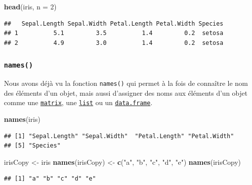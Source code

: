 \documentclass[]{book}
\newenvironment{Shaded}{\begin{snugshade}}{\end{snugshade}}
\newcommand{\DataTypeTok}[1]{\textcolor[rgb]{0.13,0.29,0.53}{#1}}
\newcommand{\DecValTok}[1]{\textcolor[rgb]{0.00,0.00,0.81}{#1}}
\newcommand{\KeywordTok}[1]{\textcolor[rgb]{0.13,0.29,0.53}{\textbf{#1}}}
\newcommand{\NormalTok}[1]{#1}
\newcommand{\StringTok}[1]{\textcolor[rgb]{0.31,0.60,0.02}{#1}}
\begin{document}
\begin{Shaded}
\begin{Highlighting}[]
\KeywordTok{head}\NormalTok{(iris, }\DataTypeTok{n =} \DecValTok{2}\NormalTok{)}
\end{Highlighting}
\end{Shaded}

\begin{verbatim}
##   Sepal.Length Sepal.Width Petal.Length Petal.Width Species
## 1          5.1         3.5          1.4         0.2  setosa
## 2          4.9         3.0          1.4         0.2  setosa
\end{verbatim}

\hypertarget{l015names}{%
\subsubsection{\texorpdfstring{\texttt{names()}}{names()}}\label{l015names}}

Nous avons déjà vu la fonction \texttt{names()} qui permet à la fois de connaître le nom des éléments d'un objet, mais aussi d'assigner des noms aux éléments d'un objet comme une \protect\hyperlink{l014matrix}{\texttt{matrix}}, une \protect\hyperlink{l014list}{\texttt{list}} ou un \protect\hyperlink{l014dataframe}{\texttt{data.frame}}.

\begin{Shaded}
\begin{Highlighting}[]
\KeywordTok{names}\NormalTok{(iris)}
\end{Highlighting}
\end{Shaded}

\begin{verbatim}
## [1] "Sepal.Length" "Sepal.Width"  "Petal.Length" "Petal.Width" 
## [5] "Species"
\end{verbatim}

\begin{Shaded}
\begin{Highlighting}[]
\NormalTok{irisCopy <-}\StringTok{ }\NormalTok{iris}
\KeywordTok{names}\NormalTok{(irisCopy) <-}\StringTok{ }\KeywordTok{c}\NormalTok{(}\StringTok{"a"}\NormalTok{, }\StringTok{"b"}\NormalTok{, }\StringTok{"c"}\NormalTok{, }\StringTok{"d"}\NormalTok{, }\StringTok{"e"}\NormalTok{)}
\KeywordTok{names}\NormalTok{(irisCopy)}
\end{Highlighting}
\end{Shaded}

\begin{verbatim}
## [1] "a" "b" "c" "d" "e"
\end{verbatim}
\end{document}
